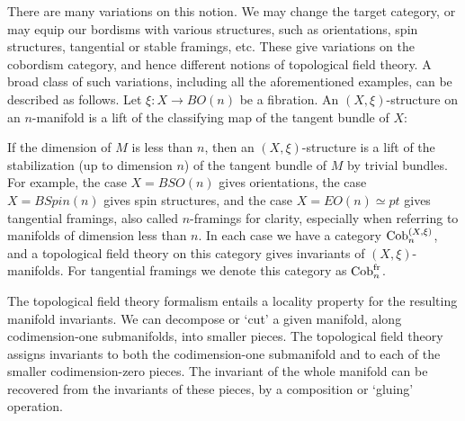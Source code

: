 \documentclass[a4paper]{amsart}
\begin{document}
There are many variations on this notion. We may change the target category, or may equip our bordisms with various structures, such as orientations, spin structures, tangential or stable framings, etc. These give variations on the cobordism category, and hence different notions of topological field theory. A broad class of such variations, including all the aforementioned examples, can be described as follows.  Let $\xi: X \to BO(n)$ be a fibration. An $(X, \xi)$-structure on an $n$-manifold is a lift of the classifying map of the tangent bundle of $X$:
\begin{center}
\end{center}
If the dimension of $M$ is less than $n$, then an $(X,\xi)$-structure is a lift of the stabilization (up to dimension $n$) of the tangent bundle of $M$ by trivial bundles.  For example, the case $X = BSO(n)$ gives orientations, the case $X = BSpin(n)$ gives spin structures, and the case $X = EO(n) \simeq pt$ gives tangential framings, also called $n$-framings for clarity, especially when referring to manifolds of dimension less than $n$.  
In each case we have a category $\mathrm{Cob}_n^{(X, \xi)}$, and a topological field theory on this category gives invariants of $(X,\xi)$-manifolds. For tangential framings we denote this category as $\mathrm{Cob}_n^{\mathrm{fr}}$.

The topological field theory formalism entails a locality property for the resulting manifold invariants. We can decompose or `cut' a given manifold, along codimension-one submanifolds, into smaller pieces. The topological field theory assigns invariants to both the codimension-one submanifold and to each of the smaller codimension-zero pieces.  The invariant of the whole manifold can be recovered from the invariants of these pieces, by a composition or `gluing' operation.
\end{document}

